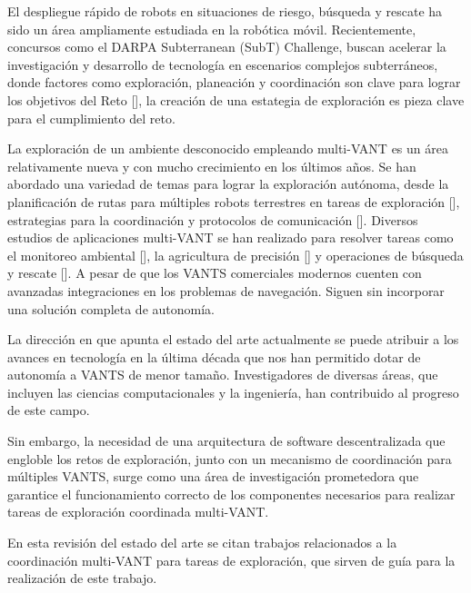 El despliegue r\'{a}pido de robots en situaciones de riesgo, b\'{u}squeda y rescate ha sido un \'{a}rea ampliamente estudiada en la rob\'{o}tica m\'{o}vil. Recientemente, concursos como el DARPA Subterranean (SubT) Challenge, buscan acelerar la investigación y desarrollo de tecnología en escenarios complejos subterráneos, donde factores como exploraci\'{o}n, planeaci\'{o}n y coordinaci\'{o}n son clave para lograr los objetivos del Reto [], la creación de una estategia de exploración es pieza clave para el cumplimiento del reto.


La exploraci\'{o}n de un ambiente desconocido empleando multi-VANT es un \'{a}rea relativamente nueva y con mucho crecimiento en los \'{u}ltimos a\~{n}os. Se han abordado una variedad de temas para lograr la exploraci\'{o}n aut\'{o}noma, desde la planificaci\'{o}n de rutas para m\'{u}ltiples robots terrestres en tareas de exploraci\'{o}n [], estrategias para la coordinaci\'{o}n y protocolos de comunicaci\'{o}n []. Diversos estudios de aplicaciones multi-VANT se han realizado para resolver tareas como el monitoreo ambiental [], la agricultura de precisi\'{o}n [] y operaciones de b\'{u}squeda y rescate []. A pesar de que los VANTS comerciales modernos cuenten con avanzadas integraciones en los problemas de navegación. Siguen sin incorporar una solución completa de autonomía.

La direcci\'{o}n en que apunta el estado del arte actualmente se puede atribuir a los avances en tecnolog\'{i}a en la \'{u}ltima d\'{e}cada que nos han permitido dotar de autonomía a VANTS de menor tamaño. Investigadores de diversas \'{a}reas, que incluyen las ciencias computacionales y la ingeniería, han contribuido al progreso de este campo.

Sin embargo, la necesidad de una arquitectura de software descentralizada que engloble los retos de exploración, junto con un mecanismo de coordinación para múltiples VANTS, surge como una área de investigación prometedora que garantice el funcionamiento correcto de los componentes necesarios para realizar tareas de exploración coordinada multi-VANT.

En esta revisión del estado del arte se citan trabajos relacionados a la coordinación multi-VANT para tareas de exploración, que sirven de guía para la realización de este trabajo.

